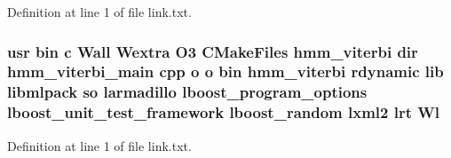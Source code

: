 Definition at line 1 of file link.\-txt.

\subsubsection[{Wl}]{\setlength{\rightskip}{0pt plus 5cm}usr bin c Wall Wextra O3 C\-Make\-Files hmm\-\_\-viterbi dir hmm\-\_\-viterbi\-\_\-main cpp o o bin hmm\-\_\-viterbi rdynamic lib libmlpack so larmadillo lboost\-\_\-program\-\_\-options lboost\-\_\-unit\-\_\-test\-\_\-framework lboost\-\_\-random lxml2 lrt Wl}\label{methods_2hmm_2CMakeFiles_2hmm__viterbi_8dir_2link_8txt_a74966e2d26eb4771be15e92230e69763}


Definition at line 1 of file link.\-txt.

